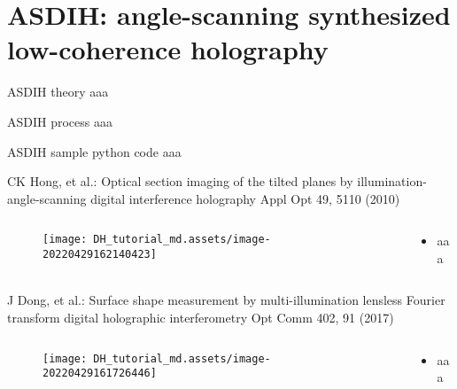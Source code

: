 \documentclass[t, aspectratio=169]{beamer}
\begin{document}
\section{ASDIH: angle-scanning synthesized low-coherence holography}
\begin{frame}[c]
	\centering\LARGE\textbf{\secname}
\end{frame}



\begin{frame}{ASDIH theory}
aaa
\end{frame}


\begin{frame}{ASDIH process}
aaa
\end{frame}


\begin{frame}{ASDIH sample python code}
aaa
\end{frame}


\begin{frame}{CK Hong, et al.: Optical section imaging of the tilted planes by illumination-angle-scanning digital interference holography}
	\vspace{-3 mm}
	\small Appl Opt 49, 5110 (2010)
	\begin{columns}
		\begin{column}{.6\textwidth}
			\begin{figure}
				\texttt{[image: DH\_tutorial\_md.assets/image-20220429162140423]}
			\end{figure}
		\end{column}
		\begin{column}{.4\textwidth}
			\begin{itemize}
				\item aaa
			\end{itemize}
		\end{column}
	\end{columns}
\end{frame}

 
\begin{frame}{J Dong, et al.: Surface shape measurement by multi-illumination lensless Fourier transform digital holographic interferometry}
	\vspace{-3 mm}
	\small Opt Comm 402, 91 (2017)
	\begin{columns}
		\begin{column}{.6\textwidth}
			\begin{figure}
				\texttt{[image: DH\_tutorial\_md.assets/image-20220429161726446]}
			\end{figure}
		\end{column}
		\begin{column}{.4\textwidth}
			\begin{itemize}
				\item aaa
			\end{itemize}
		\end{column}
	\end{columns}
\end{frame}
\end{document}
